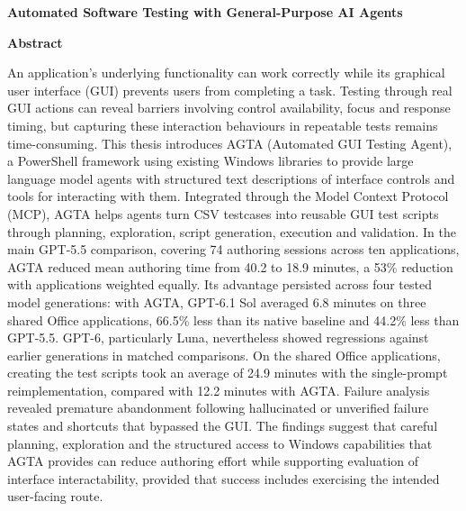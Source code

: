 \documentclass[12pt, a4paper, oneside]{report}
\begin{document}
\begin{center}
  {\fontsize{16pt}{20pt}\selectfont\bfseries Automated Software Testing with General-Purpose AI Agents\par}
  \vspace{8pt}
  {\fontsize{14pt}{18pt}\selectfont\bfseries Abstract\par}
\end{center}
\vspace{6pt}

An application’s underlying functionality can work correctly while its graphical user interface (GUI) prevents users from completing a task. Testing through real GUI actions can reveal barriers involving control availability, focus and response timing, but capturing these interaction behaviours in repeatable tests remains time-consuming. This thesis introduces AGTA (Automated GUI Testing Agent), a PowerShell framework using existing Windows libraries to provide large language model agents with structured text descriptions of interface controls and tools for interacting with them. Integrated through the Model Context Protocol (MCP), AGTA helps agents turn CSV testcases into reusable GUI test scripts through planning, exploration, script generation, execution and validation. In the main GPT-5.5 comparison, covering 74 authoring sessions across ten applications, AGTA reduced mean authoring time from 40.2 to 18.9 minutes, a 53\% reduction with applications weighted equally. Its advantage persisted across four tested model generations: with AGTA, GPT-6.1 Sol averaged 6.8 minutes on three shared Office applications, 66.5\% less than its native baseline and 44.2\% less than GPT-5.5. GPT-6, particularly Luna, nevertheless showed regressions against earlier generations in matched comparisons. On the shared Office applications, creating the test scripts took an average of 24.9 minutes with the single-prompt reimplementation, compared with 12.2 minutes with AGTA. Failure analysis revealed premature abandonment following hallucinated or unverified failure states and shortcuts that bypassed the GUI. The findings suggest that careful planning, exploration and the structured access to Windows capabilities that AGTA provides can reduce authoring effort while supporting evaluation of interface interactability, provided that success includes exercising the intended user-facing route.
\end{document}
